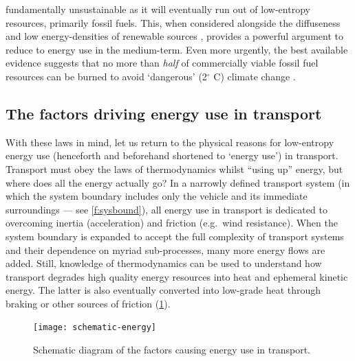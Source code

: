 fundamentally unsustainable as it will eventually run out of low-entropy
resources, primarily fossil fuels. This, when considered alongside the
diffuseness and low energy-densities of renewable sources \citep{MacKay2009},
provides a powerful argument to reduce to energy use in the medium-term.
Even more urgently, the best available evidence suggests that
no more than \emph{half} of commercially viable fossil fuel resources can be
burned to avoid `dangerous' (2$^\circ$ C) climate change
\citep{Berners-Lee2013}. %

\subsection{The factors driving energy use in transport}
With these laws in mind, let us return to the physical reasons for
low-entropy energy use (henceforth and beforehand shortened to `energy use') in
transport. Transport must obey the laws of thermodynamics
whilst ``using up'' energy, but where does all the energy actually go?
In a narrowly defined transport system (in which the system boundary
includes only the vehicle and its immediate surroundings --- see
\cref{f:sysbound}), all energy use in transport is dedicated to overcoming
inertia (acceleration) and friction (e.g.~wind resistance).
When the system boundary is expanded to accept the full complexity of transport
systems and their dependence on myriad sub-processes, many more energy flows
are added. Still, knowledge of
thermodynamics can be used to understand
how transport degrades high quality energy resources into heat and
ephemeral kinetic energy. The latter is also eventually converted into low-grade
heat through braking or other sources of friction (\cref{fig:trans-schema}).

\begin{figure}[h]
 \begin{center}
 \texttt{[image: schematic-energy]}\end{center}
 \caption{Schematic diagram of the factors causing energy use in transport.}
 \label{fig:trans-schema}
\end{figure}

